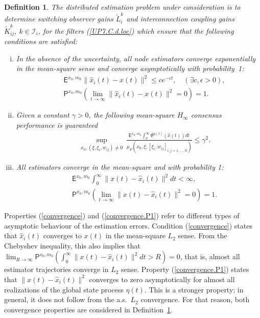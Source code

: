 \documentclass[a4paper,twocolumn]{autart}
\newtheorem{definition}{Definition}
\begin{document}
\begin{definition}\label{Def1}
The distributed estimation problem under consideration is
to determine switching observer gains
${\tilde L}_i^k$ and interconnection coupling gains
${\tilde K}_{ij}^k,~k\in\mathcal{I}_i$, for the filters 
(\ref{UP7.C.d.loc}) which ensure that the following conditions are
satisfied:
  \begin{enumerate}[(i)]
  \item
In the absence of the uncertainty, all node estimators converge
exponentially in the mean-square sense and converge asymptotically with probability~1:
\begin{eqnarray*}
&&
\mathsf{E}^{x_0,m_0} \|\hat x_i(t)-x(t)\|^2
\le c e^{-\epsilon t}, \quad (\exists c,\epsilon>0), \\
&& 
\mathsf{P}^{x_0,m_0} (\lim_{t\to\infty}\|\hat x_i(t)-x(t)\|^2= 0)=1.
\end{eqnarray*}

\item Given a constant $\gamma>0$, 
the following mean-square $H_\infty$ consensus performance is guaranteed
\begin{eqnarray}\label{objective.i.1}
&&\sup_{x_0, (\xi,\xi_i,w_{ij})\neq 0}\,
\frac{\mathsf{E}^{x_0,m_0}\int_0^\infty\Psi^{\eta(t)}(\hat x(t))dt}
{\mu_P(x_0,\xi,[\xi_i,w_{ij}]_{i,j=1,\ldots,N})}
\le \gamma^2.
\end{eqnarray}

\item
 All estimators converge in the mean-square and with probability 1:
\begin{eqnarray}
&&\mathsf{E}^{x_0,m_0}\int_0^\infty \|x(t)-\hat x_i(t)\|^2dt <\infty,  
\label{convergence} \\
&&\mathsf{P}^{x_0,m_0} (\lim_{t\to\infty}\|x(t)-\hat x_i(t)\|^2= 0)=1.
 \label{convergence.P1}
\end{eqnarray}
  \end{enumerate}
\end{definition}
Properties (\ref{convergence}) and (\ref{convergence.P1}) refer to
different types of asymptotic behaviour of the estimation errors. Condition
(\ref{convergence}) states that $\hat x_i(t)$ converges to $x(t)$
in the mean-square $L_2$ sense. From the Chebyshev inequality, this also implies that
$\lim_{R\to \infty}\mathsf{P}^{x_0,m_0}
\left(\int_0^\infty\|x(t)-\hat x_i(t)\|^2dt> R\right)=0$,
that is, almost all estimator trajectories converge in $L_2$ sense.
Property (\ref{convergence.P1}) states that $\|x(t)-\hat x_i(t)\|^2$ converges to zero
asymptotically for almost
all realizations of the global state process $\eta(t)$. This is a stronger
property; in general, it does not follow from the a.s.~$L_2$
convergence. For that reason, both convergence properties are
considered in Definition~\ref{Def1}.    
\end{document}
